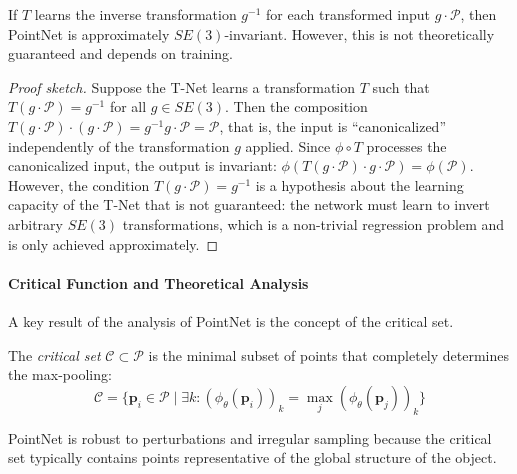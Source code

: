 \begin{proposition}
If $T$ learns the inverse transformation $g^{-1}$ for each transformed input $g \cdot \mathcal{P}$, then PointNet is approximately $SE(3)$-invariant. However, this is not theoretically guaranteed and depends on training.
\end{proposition}

\begin{proof}[Proof sketch]
Suppose the T-Net learns a transformation $T$ such that $T(g \cdot \mathcal{P}) = g^{-1}$ for all $g \in SE(3)$. Then the composition $T(g \cdot \mathcal{P}) \cdot (g \cdot \mathcal{P}) = g^{-1} g \cdot \mathcal{P} = \mathcal{P}$, that is, the input is ``canonicalized'' independently of the transformation $g$ applied. Since $\phi \circ T$ processes the canonicalized input, the output is invariant: $\phi(T(g \cdot \mathcal{P}) \cdot g \cdot \mathcal{P}) = \phi(\mathcal{P})$. However, the condition $T(g \cdot \mathcal{P}) = g^{-1}$ is a hypothesis about the learning capacity of the T-Net that is not guaranteed: the network must learn to invert arbitrary $SE(3)$ transformations, which is a non-trivial regression problem and is only achieved approximately.
\end{proof}

\paragraph{Critical Function and Theoretical Analysis}

A key result of the analysis of PointNet is the concept of the critical set.

\begin{definition}\label{def:critical_set_pointnet}
The \textit{critical set} $\mathcal{C} \subset \mathcal{P}$ is the minimal subset of points that completely determines the max-pooling:
\begin{equation}
\mathcal{C} = \{\mathbf{p}_i \in \mathcal{P} \mid \exists k: (\phi_\theta(\mathbf{p}_i))_k = \max_{j}(\phi_\theta(\mathbf{p}_j))_k\}
\end{equation}
\end{definition}

\begin{proposition}
PointNet is robust to perturbations and irregular sampling because the critical set typically contains points representative of the global structure of the object.
\end{proposition}


